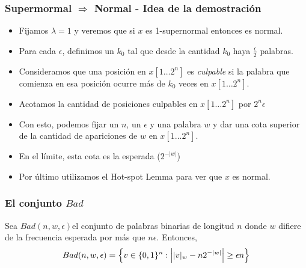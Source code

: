 \documentclass[10pt,mathserif]{beamer}%
\begin{document}
\begin{frame}

  \frametitle{Supermormal $\Rightarrow$ Normal - Idea de la demostración}
  \begin{itemize}
    \item Fijamos $\lambda = 1$ y veremos que si $x$ es 1-supernormal entonces es normal. 
    \item Para cada $\epsilon$, definimos un  $k_0$ tal que desde la cantidad $k_0$ haya $\frac{\epsilon}{2}$ palabras.
    \item Consideramos que una posición en $x[1\dots2^n ]$ es \textit{culpable} si la palabra que comienza en esa posición ocurre más de $k_0$ veces en $x[1\dots2^n ]$.
    \item Acotamos la cantidad de posiciones culpables en $x[1\dots2^n ]$ por $2^n\epsilon$
    \item Con esto, podemos fijar un $n$, un $\epsilon$ y una palabra $w$ y dar una cota superior de la cantidad de apariciones de $w$ en $x[1\dots2^n ]$.
    \item En el límite, esta cota es la esperada ($2^{-|w|}$)
    \item Por último utilizamos el Hot-spot Lemma para ver que $x$ es normal.
  \end{itemize}
 
\end{frame}

\begin{frame}
  \frametitle{El conjunto $Bad$}
  \begin{definition}
    Sea $Bad(n, w, \epsilon)$el conjunto de palabras binarias de longitud $n$ donde $w$ difiere de la frecuencia esperada por más que
    $n \epsilon$. Entonces,
    $$Bad(n, w, \epsilon)=\Big{\{}v\in \{0,1\}^n: \Big{|} |v|_w - n 2^{-|w|} \Big{|} \geq \epsilon n \Big{\} }$$
  \end{definition}
  
\end{frame}
\end{document}

